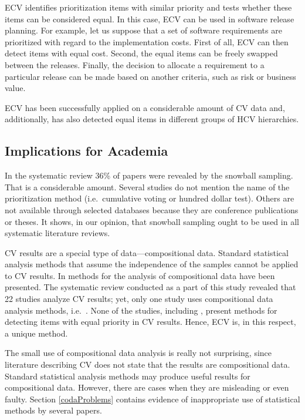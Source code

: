 ECV identifies prioritization items with similar priority and tests whether these items can be considered equal.
In this case, ECV can be used in software release planning.
For example, let us suppose that a set of software requirements are prioritized with regard to the implementation costs.
First of all, ECV can then detect items with equal cost.
Second, the equal items can be freely swapped between the releases.
Finally, the decision to allocate a requirement to a particular release can be made based on another criteria, such as risk or business value.

ECV has been successfully applied on a considerable amount of CV data and, additionally, has also detected equal items in different groups of HCV hierarchies.

\subsection{Implications for Academia}
In the systematic review 36\% of papers were revealed by the snowball sampling.
That is a considerable amount.
Several studies do not mention the name of the prioritization method (i.e.\ cumulative voting or hundred dollar test).
Others are not available through selected databases because they are conference publications or theses.
It shows, in our opinion, that snowball sampling ought to be used in all systematic literature reviews.

CV results are a special type of data---compositional data.
Standard statistical analysis methods that assume the independence of the samples cannot be applied to CV results.
In \cite{Aitchison1986} methods for the analysis of compositional data have been presented.
The systematic review conducted as a part of this study revealed that 22 studies analyze CV results; yet, only one study uses compositional data analysis methods, i.e.\ \cite{Chatzipetrou2010}.
None of the studies, including \cite{Chatzipetrou2010}, present methods for detecting items with equal priority in CV results. Hence, ECV is, in this respect, a unique method.

The small use of compositional data analysis is really not surprising, since literature describing CV does not state that the results are compositional data.
Standard statistical analysis methods may produce useful results for compositional data.
However, there are cases when they are misleading or even faulty.
Section \ref{codaProblems} contains evidence of inappropriate use of statistical methods by several papers.

